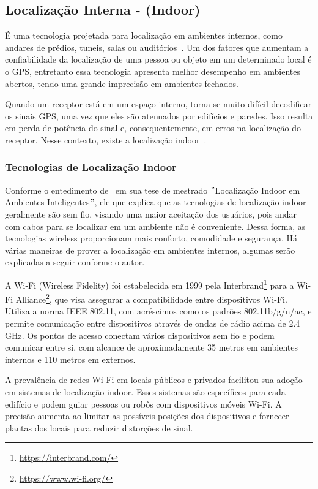 \subsection{Localização Interna - (Indoor)}\label{subsec:localizacao-indoor}

É uma tecnologia projetada para localização em ambientes internos, como andares de prédios, tuneis, salas ou auditórios~\cite{mittelstadt2018bluepath}.
Um dos fatores que aumentam a confiabilidade da localização de uma pessoa ou objeto em um determinado local é o GPS, entretanto essa tecnologia apresenta melhor desempenho em ambientes abertos, tendo uma grande imprecisão em ambientes fechados.

Quando um receptor está em um espaço interno, torna-se muito difícil decodificar os sinais GPS, uma vez que eles são atenuados por edifícios e paredes.
Isso resulta em perda de potência do sinal e, consequentemente, em erros na localização do receptor.
Nesse contexto, existe a localização indoor~\cite{mittelstadt2018bluepath}.

\subsubsection{Tecnologias de Localização Indoor}\label{subsubsec:tecnologias-localizacao-indoor}
Conforme o entedimento de~\cite{novais2014localizaccao} em sua tese de mestrado \("\)Localização Indoor em Ambientes Inteligentes\("\), ele que explica que as tecnologias de localização indoor geralmente são sem fio, visando uma maior aceitação dos usuários, pois andar com cabos para se localizar em um ambiente não é conveniente.
Dessa forma, as tecnologias wireless proporcionam mais conforto, comodidade e segurança.
Há várias maneiras de prover a localização em ambientes internos, algumas serão explicadas a seguir conforme o autor.

\label{subsubsubsec:wifi}
A Wi-Fi (Wireless Fidelity) foi estabelecida em 1999 pela Interbrand\footnote{\url{https://interbrand.com/}} para a Wi-Fi Alliance\footnote{\url{https://www.wi-fi.org/}}, que visa assegurar a compatibilidade entre dispositivos Wi-Fi. Utiliza a norma IEEE 802.11, com acréscimos como os padrões 802.11b/g/n/ac, e permite comunicação entre dispositivos através de ondas de rádio acima de 2.4 GHz. Os pontos de acesso conectam vários dispositivos sem fio e podem comunicar entre si, com alcance de aproximadamente 35 metros em ambientes internos e 110 metros em externos.

A prevalência de redes Wi-Fi em locais públicos e privados facilitou sua adoção em sistemas de localização indoor.
Esses sistemas são específicos para cada edifício e podem guiar pessoas ou robôs com dispositivos móveis Wi-Fi. A precisão aumenta ao limitar as possíveis posições dos dispositivos e fornecer plantas dos locais para reduzir distorções de sinal.

